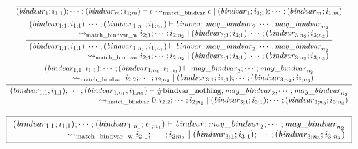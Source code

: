 \begin{gather*}
    \infer{(\mathit{bindvar}_1; i_{1;1}); \cdots; (\mathit{bindvar}_m; i_{1;m}) \vdash \epsilon \rightsquigarrow_\mathrm{match\_bindvar} \epsilon \mid (\mathit{bindvar}_1; i_{1;1}); \cdots; (\mathit{bindvar}_m; i_{1;m})}{}
    \\
    \infer{\begin{array}{r}
        (\mathit{bindvar}_{1;1}; i_{1;1}); \cdots; (\mathit{bindvar}_{1;n_1}; i_{1;n_1}) \vdash \mathit{bindvar}; \mathit{may\_bindvar}_2; \cdots; \mathit{may\_bindvar}_{n_2}
        \\
        \rightsquigarrow_\mathrm{match\_bindvar} i_{2;1}; \cdots; i_{2;n_2} \mid (\mathit{bindvar}_{3;1}; i_{3;1}); \cdots; (\mathit{bindvar}_{3;n_3}; i_{3;n_3})
    \end{array}}{
        \begin{array}{r}
            (\mathit{bindvar}_{1;1}; i_{1;1}); \cdots; (\mathit{bindvar}_{1;n_1}; i_{1;n_1}) \vdash \mathit{bindvar}; \mathit{may\_bindvar}_2; \cdots; \mathit{may\_bindvar}_{n_2}
            \\
            \rightsquigarrow_\mathrm{match\_bindvar\_w} i_{2;1}; \cdots; i_{2;n_2} \mid (\mathit{bindvar}_{3;1}; i_{3;1}); \cdots; (\mathit{bindvar}_{3;n_3}; i_{3;n_3})
        \end{array}
    }
    \\
    \infer{\begin{array}{r}
        (\mathit{bindvar}_{1;1}; i_{1;1}); \cdots; (\mathit{bindvar}_{1;n_1}; i_{1;n_1}) \vdash \mathrm{\#bindvar\_nothing}; \mathit{may\_bindvar}_2; \cdots; \mathit{may\_bindvar}_{n_2}
        \\
        \rightsquigarrow_\mathrm{match\_bindvar} 0; i_{2;2}; \cdots; i_{2;n_2} \mid (\mathit{bindvar}_{3;1}; i_{3;1}); \cdots; (\mathit{bindvar}_{3;n_3}; i_{3;n_3})
    \end{array}}{
        \begin{array}{r}
            (\mathit{bindvar}_{1;1}; i_{1;1}); \cdots; (\mathit{bindvar}_{1;n_1}; i_{1;n_1}) \vdash \mathit{may\_bindvar}_2; \cdots; \mathit{may\_bindvar}_{n_2}
            \\
            \rightsquigarrow_\mathrm{match\_bindvar} i_{2;2}; \cdots; i_{2;n_2} \mid (\mathit{bindvar}_{3;1}; i_{3;1}); \cdots; (\mathit{bindvar}_{3;n_3}; i_{3;n_3})
        \end{array}
    }
\end{gather*}

$\fbox{$\begin{array}{r}
    (\mathit{bindvar}_{1;1}; i_{1;1}); \cdots; (\mathit{bindvar}_{1;n_1}; i_{1;n_1}) \vdash \mathit{bindvar}; \mathit{may\_bindvar}_2; \cdots; \mathit{may\_bindvar}_{n_2}
    \\
    \rightsquigarrow_\mathrm{match\_bindvar\_w} i_{2;1}; \cdots; i_{2;n_2} \mid (\mathit{bindvar}_{3;1}; i_{3;1}); \cdots; (\mathit{bindvar}_{3;n_3}; i_{3;n_3})
\end{array}$}$

